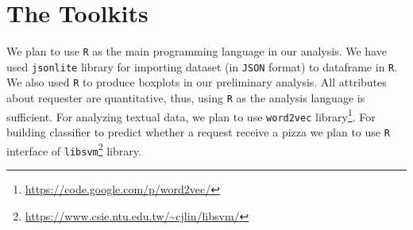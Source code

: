 \section{The Toolkits}
We plan to use \texttt{R} as the main programming language in our analysis. We have used \texttt{jsonlite} library for importing dataset (in \texttt{JSON} format) to dataframe in \texttt{R}. We also used \texttt{R} to produce boxplots in our preliminary analysis. All attributes about requester are quantitative, thus, using \texttt{R} as the analysis language is sufficient. For analyzing textual data, we plan to use \texttt{word2vec} library\footnote{\url{https://code.google.com/p/word2vec/}}. For building classifier to predict whether a request receive a pizza we plan to use \texttt{R} interface of \texttt{libsvm}\footnote{\url{https://www.csie.ntu.edu.tw/~cjlin/libsvm/}} library.